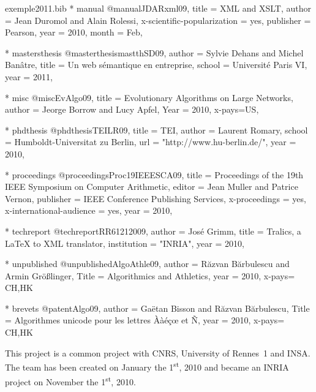 \documentclass{ra2011}
\begin{document}
\begin{filecontents+}{exemple2011.bib}
    * manual
@manual{JDARxml09,
title = {XML and XSLT},
author = {Jean Duromol and Alain Rolessi}, 
x-scientific-popularization = {yes}, 
publisher = {Pearson}, 
year = 2010, 
month = {Feb}, 
}


    * mastersthesis
@masterthesis{mastthSD09,
author = {Sylvie Dehans and Michel Banâtre},
title = {Un web sémantique en entreprise}, 
school = {Université Paris VI}, 
year = 2011, 
}


    * misc
@misc{EvAlgo09,
title = {Evolutionary Algorithms on Large Networks}, 
author = {Jeorge Borrow and Lucy Apfel}, 
Year = 2010, 
x-pays={US},
}


    * phdthesis
@phdthesis{TEILR09,
title = {TEI},
author = {Laurent Romary},
school = {Humboldt-Universitat zu Berlin},
url =  "http://www.hu-berlin.de/",
year = 2010, 
}


    * proceedings
@proceedings{Proc19IEEESCA09,
title = {Proceedings of the 19th IEEE Symposium on Computer Arithmetic}, 
editor = {Jean Muller and Patrice Vernon}, 
publisher = {IEEE Conference Publishing Services}, 
x-proceedings = {yes}, 
x-international-audience = {yes}, 
year = 2010, 
}


    * techreport
@techreport{RR61212009,
author = {José Grimm},
title = {Tralics, a LaTeX to XML translator}, 
institution = "INRIA", 
year = 2010, 
}


    * unpublished
@unpublished{AlgoAthle09,
author = {R{\u{a}}zvan B{\u{a}}rbulescu and Armin Größlinger},
Title = {Algorithmics and Athletics},
year = 2010,
x-pays= {CH,HK}
}


   * brevets
@patent{Algo09,
author = {Gaëtan Bisson and Răzvan Bărbulescu},
Title = {Algorithmes unicode pour les lettres Ààéçœ et Ñ},
year = 2010,
x-pays= {CH,HK}
}


\end{filecontents+}

\maketitle


\begin{moreinfo}
  This project is a common project with CNRS, University of Rennes~1 and INSA. The
  team has been created on January the 1\textsuperscript{st}, 2010 and became an
  INRIA project on November the 1\textsuperscript{st}, 2010.
\end{moreinfo}
\end{document}
